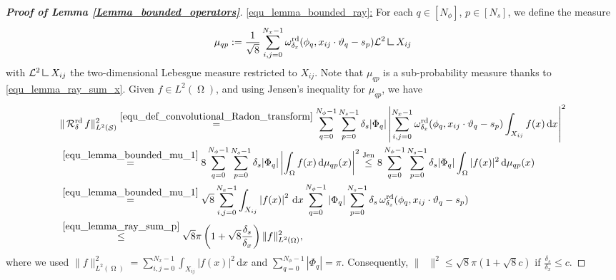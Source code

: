 \documentclass[11pt,reqno]{amsart}
\newcommand{\sumx}{\sum_{i,j=0}^{N_x-1}}
\newcommand{\sums}{\sum_{p=0}^{N_s-1}}
\newcommand{\sumphi}{\sum_{q=0}^{N_\phi-1}}
\newcommand{\mres}{\mathbin{\vrule height 1.6ex depth 0pt width
0.13ex\vrule height 0.13ex depth 0pt width 1.3ex}}
\DeclareMathOperator{\RayRadon}{\mathcal{R}^\mathrm{rd}_{\delta}}
\DeclareMathOperator{\RayWeight}{\omega^\mathrm{rd}_{\delta_\mathit{x}}}
\DeclareMathOperator{\imgdom}{\Omega}
\DeclareMathOperator{\sinodom}{\mathcal{S}}
\newcommand{\dd}[1]{\,\mathrm{d}{#1}}
\numberwithin{theorem}{section}
\theoremstyle{remark}
\begin{document}
\begin{proof}[\textbf{Proof of Lemma \ref{Lemma_bounded_operators}}]
    \underline{\eqref{equ_lemma_bounded_ray}:} 
 For each $q\in[N_\phi]$, $p\in[N_s]$, we define the measure  
\begin{equation} \label{equ_lemma_bounded_mu_1}
 \mu_{qp}:=\frac{1}{\sqrt{8}} \sumx \RayWeight(\phi_q, x_{ij}\cdot \vartheta_q-s_p) \mathcal{L}^2 \mres X_{ij}
 \end{equation} with $\mathcal{L}^2\mres X_{ij}$ the two-dimensional Lebesgue measure restricted to $X_{ij}$. Note that $\mu_{qp}$ is a sub-probability measure thanks to \eqref{equ_lemma_ray_sum_x}.
    Given $f\in L^2(\imgdom)$, and using Jensen's inequality for $\mu_{qp}$, we have
    \begin{align*}
       & \|\RayRadon f\|_{L^2(\sinodom)}^2 
        \overset{\eqref{equ_def_convolutional_Radon_transform}}{=}
         \sumphi \sums \delta_s |\Phi_q|\left|\sumx \RayWeight(\phi_q,x_{ij}\cdot \vartheta_q-s_p) \int_{X_{ij}} f(x) \dd x \right|^2 \notag
         \\
                 &\overset{\eqref{equ_lemma_bounded_mu_1}}{=} 8
         \sumphi \sums \delta_s |\Phi_q|\left| \int_{\imgdom} f(x) \dd{ \mu_{qp}(x)} \right|^2 \notag        
        \overset{\text{Jen}}{\leq}  8\sumphi \sums \delta_s |\Phi_q| \int_{\imgdom} |f(x)|^2 \dd {\mu_{qp}(x)}
        \\
  &\overset{\eqref{equ_lemma_bounded_mu_1}}{=}      \sqrt{8} 
        \sumx \int_{X_{ij}} \left|f(x) \right|^2\dd x \sumphi |\Phi_q| \sums \delta_s   \RayWeight(\phi_q, x_{ij}\cdot \vartheta_q-s_p)  
        \\
         &\overset{\eqref{equ_lemma_ray_sum_p}}{\leq}
          \sqrt{8}\pi \left(1+\sqrt{8}\frac{\delta_s}{\delta_x}\right) \|f\|_{L^2(\imgdom)}^2, \notag
    \end{align*}
    where we used $\|f\|_{L^2(\imgdom)}^2= \sumx \int_{X_{ij}} \left|f(x) \right|^2\dd x$ and $\sumphi |\Phi_q|=\pi$.
    Consequently, $\|\RayRadon\|^2\leq \sqrt{8}\pi(1 +\sqrt{8}c)$ if $\frac{\delta_s}{\delta_x}\leq c$.


\end{proof}
\end{document}
